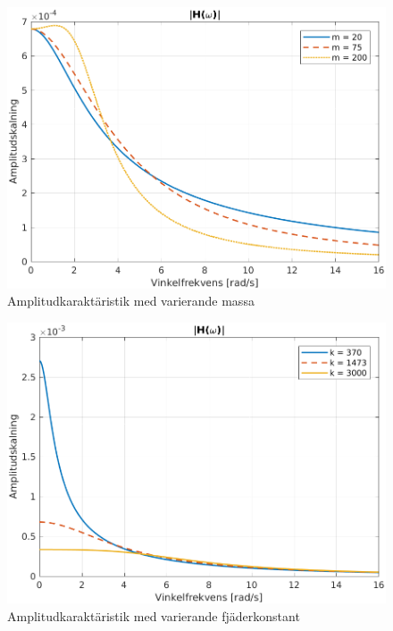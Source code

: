 \begin{figure}[H]
    \centering
    \includegraphics[scale=0.9]{bilder/amplitudkaraktaristik_variation_m}
    \caption{Amplitudkaraktäristik med varierande massa}
    \label{fig:amplitudkaraktaristik_variation_m}
\end{figure}

\newpage
\begin{figure}[H]
    \centering
    \includegraphics[scale=0.9]{bilder/amplitudkaraktaristik_variation_k}
    \caption{Amplitudkaraktäristik med varierande fjäderkonstant}
    \label{fig:amplitudkaraktaristik_variation_k}
\end{figure}

